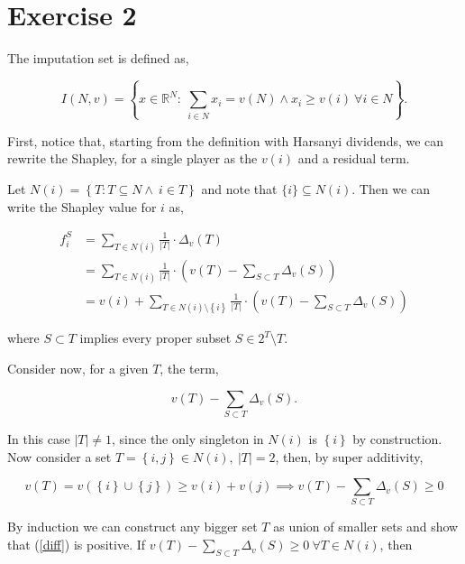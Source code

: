 \documentclass[american]{scrartcl}
\newcommand{\set}[1]{\left\{#1\right\}}
\newcommand{\Real}{\mathbb{R}}
\newcommand{\abs}[1]{\left\lvert #1 \right\rvert}
\begin{document}
\section*{Exercise 2}

The imputation set is defined as,

\begin{equation}
    I(N, v) = \set{ x \in \Real^N: \ \sum_{i \in N} x_i = v(N) \land x_i \geq v(i) \ \forall i \in N }.
\end{equation}

First, notice that, starting from the definition with Harsanyi dividends, we can rewrite the Shapley, for a single player as the $v(i)$ and a residual term.

Let $N(i) = \set{T: T \subseteq N \land \ i \in T}$ and note that $\{i\} \subseteq N(i)$. Then we can write the Shapley value for $i$ as,

\begin{equation}
    \begin{split}
        f^S_i &= \sum_{T \in N(i)} \frac{1}{\abs{T}} \cdot \Delta_v(T)\\
        &=  \sum_{T \in N(i)} \frac{1}{\abs{T}} \cdot \left( v(T) - \sum_{S \subset T} \Delta_v(S) \right) \\
        &= v(i) + \sum_{T \in N(i) \setminus \set{i} } \frac{1}{\abs{T}} \cdot \left( v(T) - \sum_{S \subset T} \Delta_v(S) \right)
    \end{split}
\end{equation}

where $S \subset T$ implies every proper subset $S \in 2^T \setminus T$.

Consider now, for a given $T$, the term,

\begin{equation} \label{diff}
    v(T) - \sum_{S \subset T} \Delta_v(S).
\end{equation}

In this case $\abs{T} \neq 1$, since the only singleton in $N(i)$ is $\set{i}$ by construction. Now consider a set $T = \set{i, j} \in N(i), \ \abs{T} = 2$, then, by super additivity,

\begin{equation}
    v(T) = v\left( \set{i} \cup \set{j} \right) \geq v(i) + v(j) \implies v(T) - \sum_{S \subset T} \Delta_v(S) \geq 0
\end{equation}

By induction we can construct any bigger set $T$ as union of smaller sets and show that (\ref{diff}) is positive. If $v(T) -\sum_{S \subset T} \Delta_v(S) \geq 0 \ \forall T \in N(i)$, then
\end{document}
